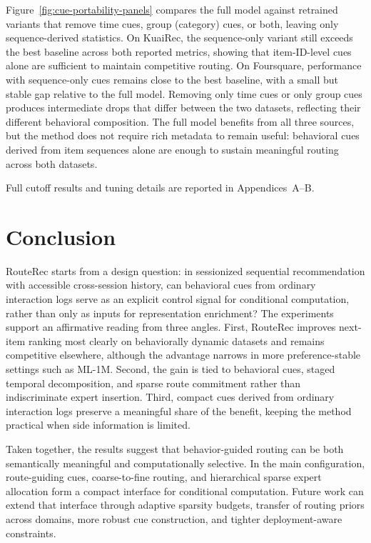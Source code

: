 \documentclass[sigconf,review,anonymous]{acmart}
\begin{document}
Figure~\ref{fig:cue-portability-panels} compares the full model against retrained variants that remove time cues, group (category) cues, or both, leaving only sequence-derived statistics. On KuaiRec, the sequence-only variant still exceeds the best baseline across both reported metrics, showing that item-ID-level cues alone are sufficient to maintain competitive routing. On Foursquare, performance with sequence-only cues remains close to the best baseline, with a small but stable gap relative to the full model. Removing only time cues or only group cues produces intermediate drops that differ between the two datasets, reflecting their different behavioral composition. The full model benefits from all three sources, but the method does not require rich metadata to remain useful: behavioral cues derived from item sequences alone are enough to sustain meaningful routing across both datasets.

Full cutoff results and tuning details are reported in Appendices~A--B.

\section{Conclusion}
\label{sec:conclusion}
RouteRec starts from a design question: in sessionized sequential recommendation with accessible cross-session history, can behavioral cues from ordinary interaction logs serve as an explicit control signal for conditional computation, rather than only as inputs for representation enrichment? The experiments support an affirmative reading from three angles. First, RouteRec improves next-item ranking most clearly on behaviorally dynamic datasets and remains competitive elsewhere, although the advantage narrows in more preference-stable settings such as ML-1M. Second, the gain is tied to behavioral cues, staged temporal decomposition, and sparse route commitment rather than indiscriminate expert insertion. Third, compact cues derived from ordinary interaction logs preserve a meaningful share of the benefit, keeping the method practical when side information is limited.

Taken together, the results suggest that behavior-guided routing can be both semantically meaningful and computationally selective. In the main configuration, route-guiding cues, coarse-to-fine routing, and hierarchical sparse expert allocation form a compact interface for conditional computation. Future work can extend that interface through adaptive sparsity budgets, transfer of routing priors across domains, more robust cue construction, and tighter deployment-aware constraints.
\end{document}
